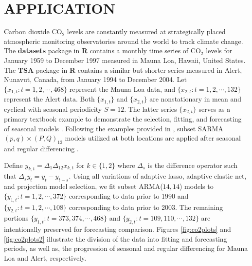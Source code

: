 \section{APPLICATION}
\label{sec:co2app}
Carbon dioxide $\textrm{CO}_2$ levels are constantly measured at strategically placed atmospheric monitoring observatories around the world to track climate change. The {\bf datasets} package in {\bf R} \citep{RCORETEAM} contains a monthly time series of  $\textrm{CO}_2$ levels for January 1959 to December 1997 measured in Mauna Loa, Hawaii, United States. The {\bf TSA} package in {\bf R} \citep{RTSA} contains a similar but shorter series  measured  in Alert, Nunavut, Canada, from January 1994 to December 2004. Let $\{x_{1,t}:t=1,2,\cdots,468\}$ represent the Mauna Loa data, and $\{x_{2,t}:t=1,2,\cdots,132\}$ represent the Alert data. Both $\{x_{1,t}\}$ and $\{x_{2,t}\}$ are nonstationary in mean and cyclical with seasonal periodicity $S=12$. The latter series $\{x_{2,t}\}$ serves as a primary textbook example  to demonstrate the selection, fitting, and forecasting of seasonal models \citep{Cryer2008}. Following the examples provided in \cite{Cryer2008,Chen2011}, subset SARMA$(p,q)\times(P,Q)_{12}$ models utilized at both locations are applied after seasonal and regular differencing . 

Define $y_{k,t}=\Delta_1\Delta_{12}x_{k,t}$ for $k\in\{1,2\}$  where $\Delta_s$ is the difference operator such that $\Delta_s y_t=y_t-y_{t-s}$.  Using all variations of adaptive lasso, adaptive elastic net, and projection model selection, we fit subset ARMA($14,14$) models to $\{y_{1,t}:t=1,2,\cdots,372\}$ corresponding to data prior to 1990 and $\{y_{2,t}:t=1,2,\cdots,108\}$ corresponding to data prior to 2003. The remaining portions $\{y_{1,t}:t=373,374,\cdots,468\}$ and $\{y_{2,t}:t=109,110,\cdots,132\}$ are intentionally preserved for forecasting comparison. Figures \ref{fig:co2plots} and \ref{fig:co2plots2} illustrate the division of the data into fitting and forecasting periods, as well as, the progression of seasonal and regular differencing for Mauna Loa and Alert, respectively.

